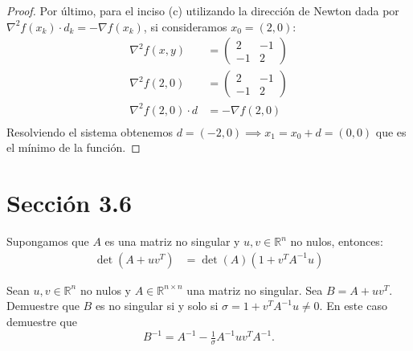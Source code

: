 \documentclass{article}
\newenvironment{theorem}[2][Ejercicio]{\begin{trivlist}
\item[\hskip \labelsep {\bfseries #1}\hskip \labelsep {\bfseries #2.}]}{\end{trivlist}}
\newenvironment{lemma}[2][Lemma]{\begin{trivlist}
\item[\hskip \labelsep {\bfseries #1}\hskip \labelsep {\bfseries #2.}]}{\end{trivlist}}
\begin{document}
\begin{proof}
    Por último, para el inciso (c) utilizando la dirección de Newton dada por \( \nabla^2 f(x_k) \cdot d_k = - \nabla f(x_k) \), si consideramos \( x_0 = (2,0) \): \begin{align*}
        \nabla^2 f(x,y)          & = \begin{pmatrix}
                                         2  & -1 \\
                                         -1 & 2
                                     \end{pmatrix}   \\
        \nabla^2 f(2,0)          & = \begin{pmatrix}
                                         2  & -1 \\
                                         -1 & 2
                                     \end{pmatrix}   \\
        \nabla^2 f(2, 0) \cdot d & = - \nabla f(2, 0) \\
    \end{align*}
    Resolviendo el sistema obtenemos \( d = (-2, 0) \implies x_1 = x_0 + d = (0, 0) \) que es el mínimo de la función.
\end{proof}

\section*{Sección 3.6}
\begin{lemma}{Determinante de una matriz}
    Supongamos que \( A \) es una matriz no singular y \( u, v \in \mathbb{R}^n \) no nulos, entonces:\begin{align*}
        \det(A + u v^T) & = \det(A) (1 + v^T A^{-1} u)
    \end{align*}
\end{lemma}

\begin{theorem}{7 Fórmula de Sherman-Morrison}
    Sean \(u, v \in \mathbb{R}^n\) no nulos y \(A \in \mathbb{R}^{n \times n}\) una matriz no singular.
    Sea \( B = A + u v^T \). Demuestre que \(B\) es no singular si y solo si
    \(\sigma = 1 + v^T A^{-1} u \neq 0\). En este caso demuestre que
    \[
        B^{-1} = A^{-1} - \tfrac{1}{\sigma} A^{-1} u v^T A^{-1}.
    \]
\end{theorem}
\end{document}

